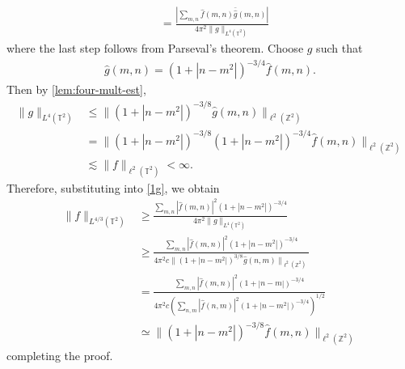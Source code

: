 \documentclass[12pt,reqno]{amsart}
\newcommand{\wh}{\widehat}
\newcommand{\zz}{\mathbb{Z}}
\newcommand{\ci}{\mathbb{T}}
\theoremstyle{plain}  %
\begin{document}
\begin{appendices}
\begin{equation}
\begin{split}
		&  =   \frac{|\sum_{m,n} \wh{f}(m,n) 
		\bar{\wh{g}}\left( m,n \right)| }{ 4 \pi^2 \|g\|_{L^4(\ci^2)}}
	\end{split}
\end{equation}
%
%
where the last step follows from Parseval's theorem. Choose $g$ such that
%
%
\begin{equation*}
	\begin{split}
		\wh{g}(m,n) = \left( 1 + |n - m^2| \right)^{-3/4} \wh{f}(m,n).
	\end{split}
\end{equation*}
%
%
Then by \autoref{lem:four-mult-est},
%
%
\begin{equation*}
	\begin{split}
		\|g\|_{L^4(\ci^2)}
		& \le \|\left( 1 + |n-m^2| \right)^{-3/8} 
		\wh{g}(m,n) \|_{\ell^2(\zz^2)}
		\\
		& = \|\left( 1 + |n-m^2| \right)^{-3/8} 
		\left( 1 + |n - m^2| \right)^{-3/4} \wh{f}(m,n)  \|_{\ell^2(\zz^2)}
		\\
		& \lesssim \|f\|_{\ell^2(\ci^2)} < \infty.
	\end{split}
\end{equation*}
%
%
Therefore, substituting into \eqref{1g}, we obtain
%
%
\begin{equation*}
	\begin{split}
		\|f\|_{L^{4/3}(\ci^2)}
		& \ge \frac{\sum_{m,n} |\wh{f}(m,n)|^2 \left( 
		1 + |n-m^2| \right)^{-3/4}}{4 \pi^2 \|g\|_{L^4(\ci^2)}}
		\\
		& \ge \frac{\sum_{m,n} |\wh{f}(m,n)|^2 \left( 
		1 + |n-m^2| \right)^{-3/4}}{4 \pi^2 c \|\left( 1 + |n - m^2| 
		\right)^{3/8} \wh{g}(n,m) \|_{\ell^2(\zz^2)}}
		\\
		& = \frac{ \sum_{m,n} |\wh{f}(m,n)|^2 \left( 1 + |n - m| 
		\right)^{-3/4}}{4 \pi^2 c \left( \sum_{n,m} |\wh{f}(n,m)|^2 \left( 
		1 + |n-m^2| \right)^{-3/4} \right)^{1/2}}
		\\
		& \simeq \|\left( 1 + |n-m^2| \right)^{-3/8} \wh{f}(m,n) \|_{\ell^2(\zz^2)}
	\end{split}
\end{equation*}
%
%
completing the proof. \qquad \qedsymbol
\vskip0.1in
%

\end{appendices}
\end{document}
